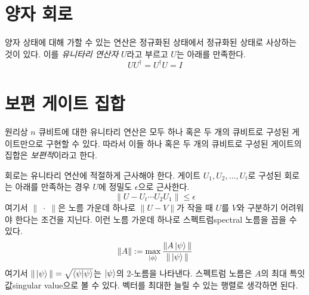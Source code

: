 \documentclass[a4paper,chapter,atbegshi]{oblivoir}
\begin{document}
\section{양자 회로}
양자 상태에 대해 가할 수 있는 연산은 정규화된 상태에서 정규화된 상태로 사상하는
것이 있다. 이를 \emph{유니타리 연산자} $U$라고 부르고 $U$는 아래를 만족한다.
\[
  UU^{\dagger}=U^{\dagger}U=I
\]
\section{보편 게이트 집합}
원리상 $n$ 큐비트에 대한 유니타리 연산은 모두 하나 혹은 두 개의 큐비트로 구성된
게이트만으로 구현할 수 있다. 따라서 이들 하나 혹은 두 개의 큐비트로 구성된
게이트의 집합은 \emph{보편적}이라고 한다. 

회로는 유니타리 연산에 적절하게 근사해야 한다. 게이트 $U_1,U_2,\ldots,U_t$로
구성된 회로는 아래를 만족하는 경우 $U$에 정밀도 $\epsilon$으로 근사한다.
\[
  \|U-U_t\cdots U_2U_1\|\leq\epsilon
\]
여기서 $\|\;\cdot\;\|$은 노름 가운데 하나로 $\|U-V\|$가 작을 때 $U$를 $V$와
구분하기 어려워야 한다는 조건을 지닌다. 이런 노름 가운데 하나로 
스펙트럼{\footnotesize spectral} 노름을 꼽을 수 있다.
\[
  \|A\|:=\max_{\ket{\phi}}\frac{\|A\ket{\psi}\|}{\|\ket{\psi}\|}
\]
여기서 $\|\ket{\psi}\|=\sqrt{\braket{\psi|\psi}}$는 $\ket{\psi}$의 2-노름을
나타낸다. 스펙트럼 노름은 $A$의 최대 특잇값{\footnotesize singular value}으로
볼 수 있다. 벡터를 최대한 늘릴 수 있는 행렬로 생각하면 된다.
\end{document}
